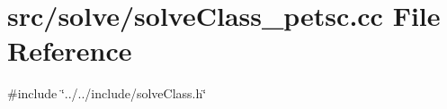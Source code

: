 \section{src/solve/solve\+Class\+\_\+petsc.cc File Reference}
\label{solve_class__petsc_8cc}
{\ttfamily \#include \char`\"{}../../include/solve\+Class.\+h\char`\"{}}\newline
